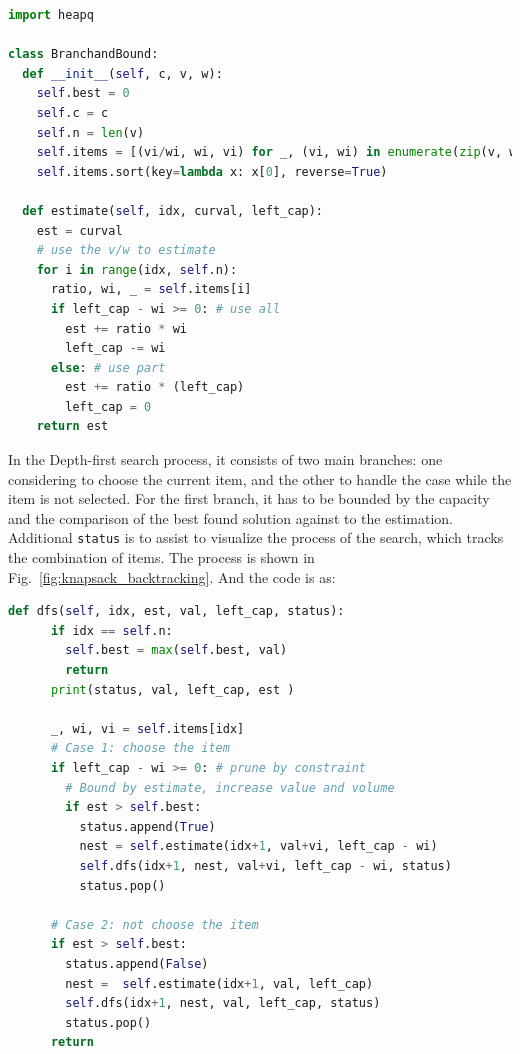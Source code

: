 \documentclass[../main.tex]{subfiles}
\begin{document}
\begin{lstlisting}[language=Python]
import heapq

class BranchandBound:
  def __init__(self, c, v, w):
    self.best = 0 
    self.c = c
    self.n = len(v)
    self.items = [(vi/wi, wi, vi) for _, (vi, wi) in enumerate(zip(v, w))]
    self.items.sort(key=lambda x: x[0], reverse=True)

  def estimate(self, idx, curval, left_cap):
    est = curval
    # use the v/w to estimate
    for i in range(idx, self.n):
      ratio, wi, _ = self.items[i]
      if left_cap - wi >= 0: # use all
        est += ratio * wi
        left_cap -= wi
      else: # use part
        est += ratio * (left_cap)
        left_cap = 0 
    return est
\end{lstlisting}
In the Depth-first search process, it consists of two main branches: one considering to choose the current item, and the other to handle the case while the item is not selected. For the first branch, it has to be bounded by the capacity and the comparison of the best found solution against to the estimation. Additional \texttt{status} is to assist to visualize the process of the search, which tracks the combination of items. The process is shown in Fig.~\ref{fig:knapsack_backtracking}.  And the code is as:
\begin{lstlisting}[language=Python]
  def dfs(self, idx, est, val, left_cap, status):
      if idx == self.n:
        self.best = max(self.best, val)
        return
      print(status, val, left_cap, est )
      
      _, wi, vi = self.items[idx]
      # Case 1: choose the item
      if left_cap - wi >= 0: # prune by constraint
        # Bound by estimate, increase value and volume
        if est > self.best:   
          status.append(True)
          nest = self.estimate(idx+1, val+vi, left_cap - wi)   
          self.dfs(idx+1, nest, val+vi, left_cap - wi, status)
          status.pop()

      # Case 2: not choose the item
      if est > self.best:
        status.append(False)
        nest =  self.estimate(idx+1, val, left_cap)
        self.dfs(idx+1, nest, val, left_cap, status) 
        status.pop()
      return
\end{lstlisting}
\end{document}
